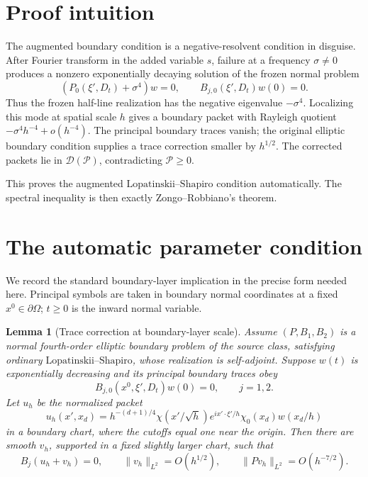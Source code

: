\documentclass[11pt]{article}
\newtheorem{lemma}[theorem]{Lemma}
\newcommand{\Om}{\Omega}
\newcommand{\pa}{\partial}
\newcommand{\LS}{\text{Lopatinskii--Shapiro}}
\newcommand{\cD}{\mathcal D}
\begin{document}
\section{Proof intuition}

The augmented boundary condition is a negative-resolvent condition in
disguise. After Fourier transform in the added variable $s$, failure at a
frequency $\sigma\ne0$ produces a nonzero exponentially decaying solution of
the frozen normal problem
\[
   (P_0(\xi',D_t)+\sigma^4)w=0,\qquad B_{j,0}(\xi',D_t)w(0)=0.
\]
Thus the frozen half-line realization has the negative eigenvalue
$-\sigma^4$. Localizing this mode at spatial scale $h$ gives a boundary
packet with Rayleigh quotient $-\sigma^4h^{-4}+o(h^{-4})$. The principal
boundary traces vanish; the original elliptic boundary condition supplies a
trace correction smaller by $h^{1/2}$. The corrected packets lie in
$\cD(\mathcal P)$, contradicting $\mathcal P\ge0$.

This proves the augmented $\LS$ condition automatically. The spectral
inequality is then exactly Zongo--Robbiano's theorem.

\section{The automatic parameter condition}

We record the standard boundary-layer implication in the precise form needed
here. Principal symbols are taken in boundary normal coordinates at a fixed
$x^0\in\pa\Om$; $t\ge0$ is the inward normal variable.

\begin{lemma}[Trace correction at boundary-layer scale]\label{trace}
Assume $(P,B_1,B_2)$ is a normal fourth-order elliptic boundary problem of the
source class, satisfying ordinary $\LS$, whose realization is self-adjoint.
Suppose $w(t)$ is exponentially decreasing and
its principal boundary traces obey
\[
 B_{j,0}(x^0,\xi',D_t)w(0)=0,\qquad j=1,2.
\]
Let $u_h$ be the normalized packet
\begin{equation}\label{packet}
 u_h(x',x_d)=h^{-(d+1)/4}\chi(x'/\sqrt h)
 e^{ix'\cdot\xi'/h}\chi_0(x_d)w(x_d/h)
\end{equation}
in a boundary chart, where the cutoffs equal one near the origin. Then there
are smooth $v_h$, supported in a fixed slightly larger chart, such that
\[
 B_j(u_h+v_h)=0,\qquad
 \|v_h\|_{L^2}=O(h^{1/2}),\qquad
 \|Pv_h\|_{L^2}=O(h^{-7/2}).
\]
\end{lemma}
\end{document}
